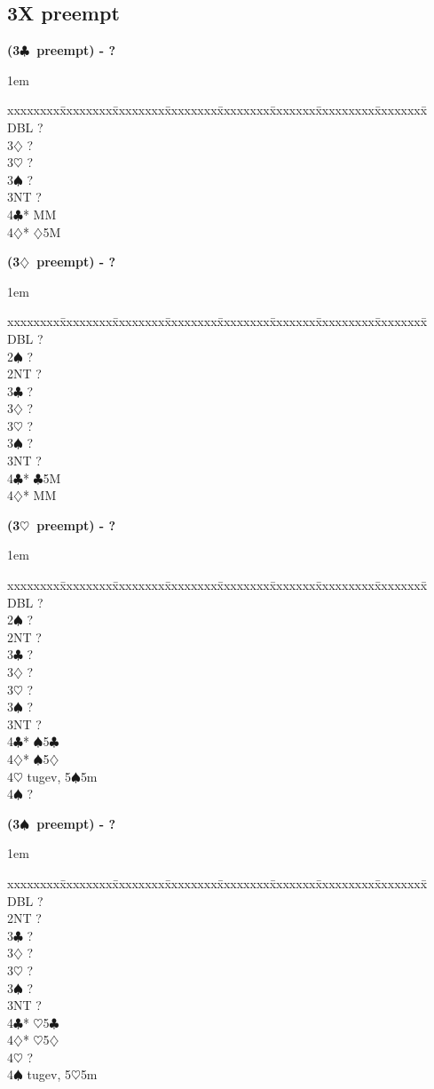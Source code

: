 \documentclass[10pt]{article}
\renewcommand{\c}{$\clubsuit$}
\renewcommand{\d}{$\diamondsuit$}
\newcommand{\h}{$\heartsuit$}
\newcommand{\s}{$\spadesuit$}
\newcommand{\x}{DBL}
\newenvironment{bidtable}[1][]
{\textbf{#1}
  \begin{adjustwidth}{1em}{}
    \addvspace{2pt}
    \begin{tabbing}
      xxxxxxxx\=xxxxxxxx\=xxxxxxxx\=xxxxxxxx\=xxxxxxxx\=xxxxxxx\=xxxxxxxxx\=xxxxxxxx\=\kill}
{\end{tabbing}\end{adjustwidth}\bigskip}%
\begin{document}
\subsection{3X preempt}

\begin{bidtable}[(3\c\ preempt) - ?]
\x   \> ?     \\
3\d  \> ?     \\
3\h  \> ?     \\
3\s  \> ?     \\
3NT  \> ?     \\
4\c* {} MM \\
4\d* {}\d 5M
\end{bidtable}

\begin{bidtable}[(3\d\ preempt) - ?]
\x   \> ?      \\
2\s  \> ?      \\
2NT  \> ?      \\
3\c  \> ?      \\
3\d  \> ?      \\
3\h  \> ?      \\
3\s  \> ?      \\
3NT  \> ?      \\
4\c* {}\c 5M \\
4\d* {} MM
\end{bidtable}

\begin{bidtable}[(3\h\ preempt) - ?]
\x   \> ?       \\
2\s  \> ?       \\
2NT  \> ?       \\
3\c  \> ?       \\
3\d  \> ?       \\
3\h  \> ?       \\
3\s  \> ?       \\
3NT  \> ?       \\
4\c* {}\s 5\c \\
4\d* {}\s 5\d \\
4\h \> tugev, 5\s 5m \\
4\s \> ? \\
\end{bidtable}

\begin{bidtable}[(3\s\ preempt) - ?]
\x   \> ?       \\
2NT  \> ?       \\
3\c  \> ?       \\
3\d  \> ?       \\
3\h  \> ?       \\
3\s  \> ?       \\
3NT  \> ?       \\
4\c* {}\h 5\c \\
4\d* {}\h 5\d \\
4\h  \> ?       \\
4\s  \> tugev, 5\h 5m
\end{bidtable}
\end{document}
